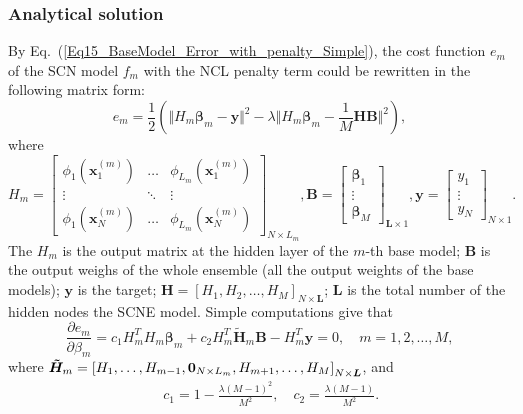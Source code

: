 \documentclass{article}
\begin{document}
\subsubsection{Analytical solution}
By Eq.~(\ref{Eq15_BaseModel_Error_with_penalty_Simple}), the cost function $e_m$ of the SCN model $f_m$ with the NCL penalty term could be rewritten in the following matrix form:
\begin{equation} 
\label{Eq17_em}
e_m = \frac{1}{2} \left( \Vert H_m \bm{\beta}_m - \bm{y} \Vert^2 - \lambda \Vert H_m \bm{\beta}_m - \frac{1}{M} \bm{H} \bm{B} \Vert^2 \right),
\end{equation}
where 
\begin{equation} \label{Eq18_Hm}
H_m =
\left[
\begin{array}{ccc}
\phi_1(\bm{x}_1^{(m)}) & \ldots & \phi_{L_m}(\bm{x}_1^{(m)}) \\
\vdots & \ddots & \vdots \\
\phi_{1}(\bm{x}_N^{(m)})  & \ldots & \phi_{L_m}(\bm{x}_N^{(m)}) 
\end{array} \right]_{N \times L_m} ,
\bm{B} = \left[
\begin{array}{c}
\bm{\beta}_1  \\
\vdots  \\
\bm{\beta}_M
\end{array} \right] _{\bm{L} \times 1}, 
\bm{y} =  
\left[
\begin{array}{c}
y_1  \\
\vdots \\
y_N
\end{array}
\right]_{N \times 1}.
\end{equation}
The $H_m$ is the output matrix at the hidden layer of the $m$-th base model; $\bm{B}$ is the output weighs of the whole ensemble (all the output weights of the base models); $\bm{y}$ is the target; $\bm{H} = \left[H_1 , H_2, \dots , H_M \right]_{N \times \bm{L}}$; $\bm{L}$ is the total number of the hidden nodes the SCNE model.
Simple computations give that
\begin{equation}
\label{Eq22_em_derivative}
\frac{\partial {e_m}}{\partial{\beta_m}} = 
c_1
H_m^T H_m \bm{\beta}_m
+
c_2
H_m^T\bm{\tilde{H}}_m\bm{B} 
-
H_m^T\bm{y}=0,\quad m = 1,2,\dots,M,
\end{equation}
where $\bm{\tilde{H}}_m  = \left[ H_1, \ldots,H_{m-1}, \bm{0}_{\tiny N \times L_m}, H_{m+1}, \ldots, H_M \right]_{N \times \bm{L}}$, and 
\begin{eqnarray}
&& c_1 = 1-\frac{\lambda(M-1)^2}{M^2} ,\quad
c_2 = \frac{\lambda(M-1)}{M^2}. \label{Eq23_c1c2}
\end{eqnarray}
\end{document}
